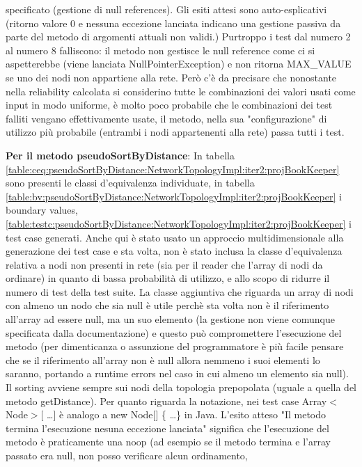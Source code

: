 \documentclass[10pt, a4paper]{article}
\newcommand{\gettablelabel}[5]{table:#1:#2:#3:iter#4:proj#5}
\def\bookkeeper{BookKeeper}
\begin{document}
	specificato (gestione di null references).
	Gli esiti attesi sono auto-esplicativi (ritorno valore 0 e nessuna eccezione
	lanciata indicano una gestione passiva da parte del metodo di argomenti attuali non validi.)
	Purtroppo i test dal numero 2 al numero 8 falliscono: il metodo non gestisce
	le null reference come ci si aspetterebbe (viene lanciata
	NullPointerException) e non ritorna MAX\_VALUE se uno dei nodi non appartiene
	alla rete. Però c'è da precisare che nonostante nella reliability calcolata
	si considerino tutte le combinazioni dei valori usati come input in modo
	uniforme, è molto poco probabile che le combinazioni dei test falliti vengano
	effettivamente usate, il metodo, nella sua "configurazione" di utilizzo più
	probabile (entrambi i nodi appartenenti alla rete) passa tutti i test.
	
	\textbf{Per il metodo pseudoSortByDistance}: In tabella 
	\ref{\gettablelabel{ceq}{pseudoSortByDistance}{NetworkTopologyImpl}{2}{\bookkeeper}}
	sono presenti le classi d'equivalenza individuate, in tabella 
	\ref{\gettablelabel{bv}{pseudoSortByDistance}{NetworkTopologyImpl}{2}{\bookkeeper}}
	i boundary values, 
	\ref{\gettablelabel{testc}{pseudoSortByDistance}{NetworkTopologyImpl}{2}{\bookkeeper}}
	i test case generati.
	Anche qui è stato usato un approccio multidimensionale alla generazione dei
	test case e sta volta, non è stato inclusa la classe d'equivalenza relativa
	a nodi non presenti in rete (sia per il reader che l'array di nodi da
	ordinare) in quanto di bassa probabilità di utilizzo, e allo scopo di ridurre
	il numero di test della test suite.
	La classe aggiuntiva che riguarda un array di nodi con almeno un nodo che sia
	null è utile perchè sta volta non è il riferimento all'array ad essere null,
	ma un suo elemento (la gestione non viene comunque specificata dalla
	documentazione) e questo può compromettere l'esecuzione del metodo (per
	dimenticanza o assunzione del programmatore è più facile pensare che se
	il riferimento all'array non è null allora nemmeno i suoi elementi lo saranno,
	portando a runtime errors nel caso in cui almeno un elemento sia null).
	Il sorting avviene sempre sui nodi della topologia prepopolata (uguale a quella
	del metodo getDistance). Per quanto riguarda la notazione, nei test case
	Array$<$Node$>$[ \dots ] è analogo a new Node[] \{ \dots \} in Java.
	L'esito atteso "Il metodo termina l'esecuzione nesuna eccezione lanciata"
	significa che l'esecuzione del metodo è praticamente una noop (ad esempio
	se il metodo termina e l'array passato era null, non posso verificare alcun
	ordinamento, 
\end{document}
